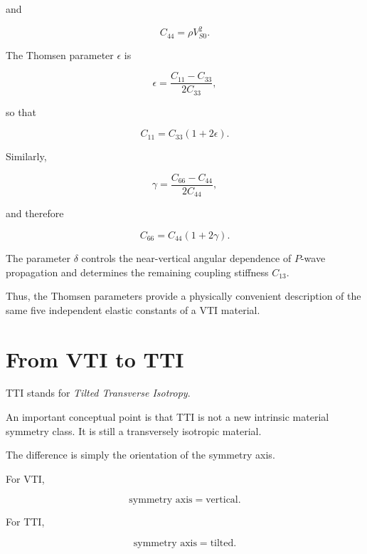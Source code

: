 \documentclass[11pt]{article}
\begin{document}
and

\begin{equation}
    C_{44} = \rho V_{S0}^2.
\end{equation}

The Thomsen parameter $\epsilon$ is

\begin{equation}
    \epsilon
    =
    \frac{C_{11}-C_{33}}{2C_{33}},
\end{equation}

so that

\begin{equation}
    C_{11}
    =
    C_{33}(1+2\epsilon).
\end{equation}

Similarly,

\begin{equation}
    \gamma
    =
    \frac{C_{66}-C_{44}}{2C_{44}},
\end{equation}

and therefore

\begin{equation}
    C_{66}
    =
    C_{44}(1+2\gamma).
\end{equation}

The parameter $\delta$ controls the near-vertical angular dependence of $P$-wave propagation and determines the remaining coupling stiffness $C_{13}$.

Thus, the Thomsen parameters provide a physically convenient description of the same five independent elastic constants of a VTI material.

\section{From VTI to TTI}

TTI stands for \emph{Tilted Transverse Isotropy}.

An important conceptual point is that TTI is not a new intrinsic material symmetry class. It is still a transversely isotropic material.

The difference is simply the orientation of the symmetry axis.

For VTI,

\begin{equation}
    \text{symmetry axis} = \text{vertical}.
\end{equation}

For TTI,

\begin{equation}
    \text{symmetry axis} = \text{tilted}.
\end{equation}
\end{document}
